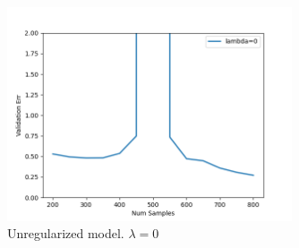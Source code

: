 \begin{answer}
    \begin{figure}[H]
        \centering
        \includegraphics[width=0.75\textwidth]{../src/doubledescent/unreg.png}
        \caption{Unregularized model. $\lambda=0$}
        \label{fig:unreg}
    \end{figure}
\end{answer}
